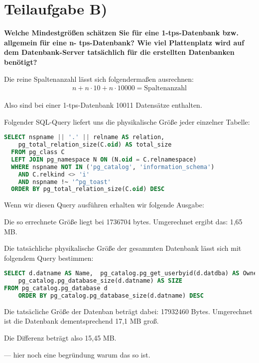 \section{Teilaufgabe B)}
\textbf{Welche Mindestgrößen schätzen Sie für eine 1-tps-Datenbank bzw. allgemein für eine n-
tps-Datenbank? Wie viel Plattenplatz wird auf dem Datenbank-Server tatsächlich für die
erstellten Datenbanken benötigt?}

Die reine Spaltenanzahl lässt sich folgendermaßen ausrechnen:
\begin{eqnarray}
n + n \cdot 10 + n \cdot 10000 = \mbox{Spaltenanzahl}
\end{eqnarray}

Also sind bei einer 1-tps-Datenbank 10011 Datensätze enthalten.


Folgender SQL-Query liefert uns die physikalische Größe jeder einzelner Tabelle:
\begin{lstlisting}[language=sql]
  SELECT nspname || '.' || relname AS relation,
    pg_total_relation_size(C.oid) AS total_size
  FROM pg_class C
  LEFT JOIN pg_namespace N ON (N.oid = C.relnamespace)
  WHERE nspname NOT IN ('pg_catalog', 'information_schema')
    AND C.relkind <> 'i'
    AND nspname !~ '^pg_toast'
  ORDER BY pg_total_relation_size(C.oid) DESC
\end{lstlisting}
Wenn wir diesen Query ausführen erhalten wir folgende Ausgabe:

Die so errechnete Größe liegt bei 1736704 bytes. Umgerechnet ergibt das: 
1,65 MB.

Die tatsächliche physikalische Größe der gesammten Datenbank lässt sich mit
folgendem Query bestimmen:
\begin{lstlisting}[language=sql]
SELECT d.datname AS Name,  pg_catalog.pg_get_userbyid(d.datdba) AS Owner,
    pg_catalog.pg_database_size(d.datname) AS SIZE
FROM pg_catalog.pg_database d
    ORDER BY pg_catalog.pg_database_size(d.datname) DESC
\end{lstlisting}

Die tatsäcliche Größe der Datenban beträgt dabei: 17932460 Bytes. Umgerechnet
ist die Datenbank dementsprechend 17,1 MB groß.

Die Differenz beträgt also 15,45 MB.

--- hier noch eine begründung warum das so ist.